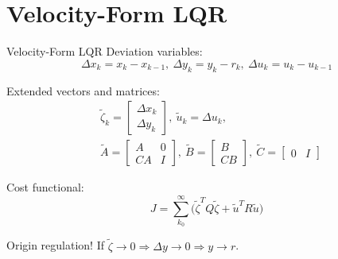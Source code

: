 \documentclass[10pt]{beamer}
\begin{document}
\section{Velocity-Form LQR}
\begin{frame}{Velocity-Form LQR}
	Deviation variables:
	\begin{equation}\label{eq:VelocityVariables}
		\Delta x_k = x_k - x_{k-1}, \ \Delta y_k = y_k - r_k, \ \Delta u_k = u_k-u_{k-1}
	\end{equation}
	
	Extended vectors and matrices:
	\begin{equation} \label{eq1}
		\begin{split}
			& \tilde{\zeta}_k = \begin{bmatrix} \Delta x_k \\ \Delta y_k	\end{bmatrix}, \ \tilde{u}_k = \Delta u_k, \\
			&\tilde{A} = \begin{bmatrix} A & 0 \\ CA & I	\end{bmatrix}, \ 
			\tilde{B} = \begin{bmatrix} B \\ CB	\end{bmatrix}, \ \tilde{C} = \begin{bmatrix} 0 & I	\end{bmatrix}
		\end{split}
	\end{equation}

	Cost functional:
	\begin{equation}\label{eq:LagrangeProblemDeviation}
		J = \sum_{k_0}^{\infty} \big(\tilde{\zeta}^TQ\tilde{\zeta} + \tilde{u}^TR\tilde{u}\big)
	\end{equation}

	Origin regulation! If $\tilde{\zeta} \rightarrow 0 \Rightarrow  \Delta y \rightarrow 0 \Rightarrow  y \rightarrow r$.
\end{frame}

\end{document}
